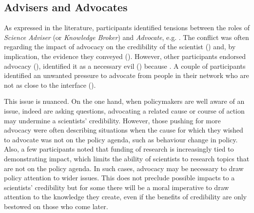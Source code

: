 \subsection{Advisers and Advocates}\label{sec:disadvocacy}

As expressed in the literature, participants identified tensions between the roles of \emph{Science Adviser} (or \emph{Knowledge Broker}) and \emph{Advocate}, e.g. . The conflict was often regarding the impact of advocacy on the credibility of the scientist () 
and, by implication, the evidence they conveyed (). However, other participants endorsed advocacy (), identified it as a necessary evil () because . A couple of participants identified an unwanted pressure to advocate from people in their network who are not as close to the interface ().

This issue is nuanced. On the one hand, when policymakers are well aware of an issue, indeed are asking questions, advocating a related cause or course of action may undermine a scientists' credibility. However, those pushing for more advocacy were often describing situations when the cause for which they wished to advocate was not on the policy agenda, such as behaviour change in \CAN{} policy. Also, a few participants noted that funding of research is increasingly tied to demonstrating impact, which limits the ability of scientists to research topics that are not on the policy agenda. In such cases, advocacy may be necessary to draw policy attention to wider issues. This does not preclude possible impacts to a scientists' credibility but for some there will be a moral imperative to draw attention to the knowledge they create, even if the benefits of credibility are only bestowed on those who come later. 

